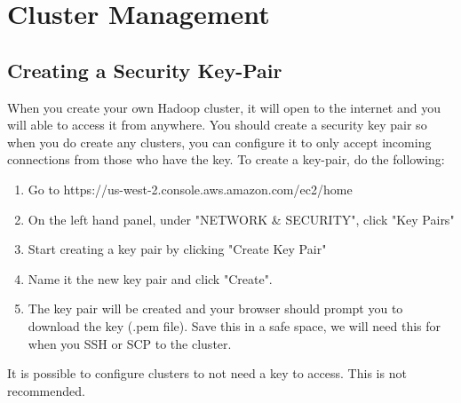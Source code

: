 \documentclass{article}
\begin{document}
\section{Cluster Management}

\subsection{Creating a Security Key-Pair}
When you create your own Hadoop cluster, it will open to the internet and you will able to access it from anywhere. You should create a security key pair so when you do create any clusters, you can configure it to only accept incoming connections from those who have the key. To create a key-pair, do the following:

\begin{enumerate}
    \item Go to https://us-west-2.console.aws.amazon.com/ec2/home
    \item On the left hand panel, under "NETWORK \& SECURITY", click "Key Pairs"
    \item Start creating a key pair by clicking "Create Key Pair"
    \item Name it the new key pair and click "Create".
    \item The key pair will be created and your browser should prompt you to download the key (.pem file). Save this in a safe space, we will need this for when you SSH or SCP to the cluster. 
\end{enumerate}

\begin{info}
It is possible to configure clusters to not need a key to access. This is not recommended.
\end{info}
\end{document}
